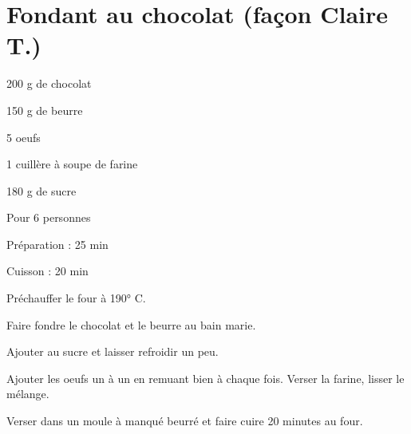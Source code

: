 \section[\normalsize{Fondant au chocolat (façon Claire T.)}]{Fondant au chocolat (façon Claire T.)}
\begin{ingredients}
\item 200 g de chocolat
\item 150 g de beurre
\item 5 oeufs
\item 1 cuill\`ere \`a soupe de farine
\item 180 g de sucre
\end{ingredients}
\begin{infos}
\item Pour 6 personnes
\item Préparation : 25 min
\item Cuisson : 20 min
\end{infos}
\begin{etapes}
\item Pr\'echauffer le four \`a 190° C.
\item Faire fondre le chocolat et le beurre au bain marie. 
\item Ajouter au sucre et laisser refroidir un peu. 
\item Ajouter les oeufs un \`a un en remuant bien \`a chaque fois. Verser la farine, lisser le m\'elange.
\item Verser dans un moule \`a manqu\'e beurr\'e et faire cuire 20 minutes au four.
\end{etapes}
\begin{conseils}
\end{conseils}
